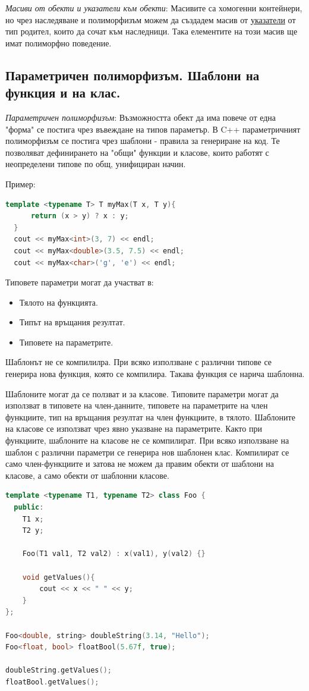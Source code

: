 \documentclass{article}
\renewcommand{\\}{\newline}
\begin{document}
\textit{Масиви от обекти и указатели към обекти}: Масивите са хомогенни контейнери, но чрез наследяване и полиморфизъм можем да създадем масив от \underline{указатели} от тип родител, които да сочат към наследници. Така елементите на този масив ще имат полиморфно поведение.

\subsection{Параметричен полиморфизъм. Шаблони на функция и на клас.}
\textit{Параметричен полиморфизъм}: Възможността обект да има повече от една "форма" се постига чрез въвеждане на типов параметър. В C++ параметричният полиморфизъм се постига чрез шаблони - правила за генериране на код. Те позволяват дефинирането на "общи" функции и класове, които работят с неопределени типове по общ, унифициран начин. 

Пример: 
\begin{lstlisting}[language=C++]
  template <typename T> T myMax(T x, T y){
      return (x > y) ? x : y;
  }
  cout << myMax<int>(3, 7) << endl;
  cout << myMax<double>(3.5, 7.5) << endl;
  cout << myMax<char>('g', 'e') << endl;
\end{lstlisting}

Типовете параметри могат да участват в: \begin{itemize}
    \item Тялото на функцията.
    \item Типът на връщания резултат.
    \item Типовете на параметрите. 
\end{itemize}

Шаблонът не се компилилра. При всяко използване с различни типове се генерира нова функция, която се компилира. Такава функция се нарича шаблонна.

Шаблоните могат да се ползват и за класове. Типовите параметри могат да използват в типовете на член-данните, типовете на параметрите на член функциите, тип на връщания резултат на член функциите, в тялото. Шаблоните на класове се използват чрез явно указване на параметрите. Както при функциите, шаблоните на класове не се компилират. При всяко използване на шаблон с различни параметри се генерира нов шаблонен клас. Компилират се само член-функциите и затова не можем да правим обекти от шаблони на класове, а само обекти от шаблонни класове. 

\begin{lstlisting}[language=C++]
template <typename T1, typename T2> class Foo {
  public:
    T1 x;
    T2 y;

    Foo(T1 val1, T2 val2) : x(val1), y(val2) {}

    void getValues(){
        cout << x << " " << y;
    }
};

Foo<double, string> doubleString(3.14, "Hello");
Foo<float, bool> floatBool(5.67f, true);

doubleString.getValues();
floatBool.getValues();
\end{lstlisting}
 
\end{document}
